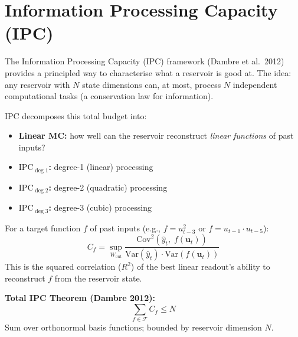 \documentclass[11pt]{article}
\newcommand{\concept}[2]{%
  \begin{tcolorbox}[conceptbox, title={#1}]
  #2
  \end{tcolorbox}
}
\newcommand{\mathblock}[2]{%
  \begin{tcolorbox}[mathbox, title={Math: #1}]
  #2
  \end{tcolorbox}
}
\begin{document}
\section{Information Processing Capacity (IPC)}

\concept{Measuring What a Reservoir Can ``Remember'' and ``Compute''}{
The Information Processing Capacity (IPC) framework (Dambre et al.\ 2012)
provides a principled way to characterise what a reservoir is good at.
The idea: any reservoir with $N$ state dimensions can, at most, process
$N$ independent computational tasks (a conservation law for information).

IPC decomposes this total budget into:
\begin{itemize}
  \item \textbf{Linear MC:} how well can the reservoir reconstruct
        \emph{linear functions} of past inputs?
  \item \textbf{$\text{IPC}_{\deg 1}$:} degree-1 (linear) processing
  \item \textbf{$\text{IPC}_{\deg 2}$:} degree-2 (quadratic) processing
  \item \textbf{$\text{IPC}_{\deg 3}$:} degree-3 (cubic) processing
\end{itemize}
}

\mathblock{IPC Definition}{
For a target function $f$ of past inputs
(e.g., $f = u_{t-3}^2$ or $f = u_{t-1} \cdot u_{t-5}$):
\[
  C_f = \sup_{W_{\text{out}}}
        \frac{\text{Cov}^2(\hat y_t,\; f(\mathbf{u}_t))}
             {\text{Var}(\hat y_t)\cdot \text{Var}(f(\mathbf{u}_t))}
\]
This is the squared correlation ($R^2$) of the best linear readout's
ability to reconstruct $f$ from the reservoir state.

\textbf{Total IPC Theorem (Dambre 2012):}
\[
  \sum_{f \in \mathcal{F}} C_f \leq N
\]
Sum over orthonormal basis functions; bounded by reservoir dimension $N$.
}
\end{document}
